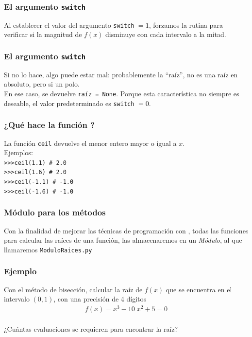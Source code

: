 \begin{frame}
\frametitle{El argumento \texttt{switch}}
Al establecer el valor del argumento \texttt{switch} $=1$, forzamos la rutina para verificar si la magnitud de $f(x)$ disminuye con cada intervalo a la mitad.
\end{frame}
\begin{frame}
\frametitle{El argumento \texttt{switch}}
Si no lo hace, algo puede estar mal: probablemente la \enquote{raíz}, no es una raíz en absoluto, pero si un polo.
\\
\bigskip
En ese caso, se devuelve \texttt{raíz = None}. Porque esta característica no siempre es deseable, el valor predeterminado es \texttt{switch} $=0$.
\end{frame}
\begin{frame}[fragile]
\frametitle{¿Qué hace la función ?}
La función \texttt{ceil} devuelve el menor entero mayor o igual a $x$.
\\
\medskip
Ejemplos:\\
\medskip
\verb|>>>ceil(1.1) # 2.0| \\
\verb|>>>ceil(1.6) # 2.0| \\
\verb|>>>ceil(-1.1) # -1.0| \\
\verb|>>>ceil(-1.6) # -1.0|
\end{frame}
\begin{frame}
\frametitle{Módulo para los métodos}
Con la finalidad de mejorar las técnicas de programación con \python, todas las funciones para calcular las raíces de una función, las almacenaremos en un \emph{Módulo}, al que llamaremos \texttt{ModuloRaices.py}
\end{frame}
\begin{frame}[fragile]
\frametitle{Ejemplo}
Con el método de bisección, calcular la raíz de $f(x)$ que se encuentra en el intervalo $(0,1)$, con una precisión de 4 dígitos
\begin{align*}
f(x) = x^{3} - 10 \; x^{2} + 5 = 0
\end{align*}
\\
\bigskip
¿Cuántas evaluaciones se requieren para encontrar la raíz?
\end{frame}
